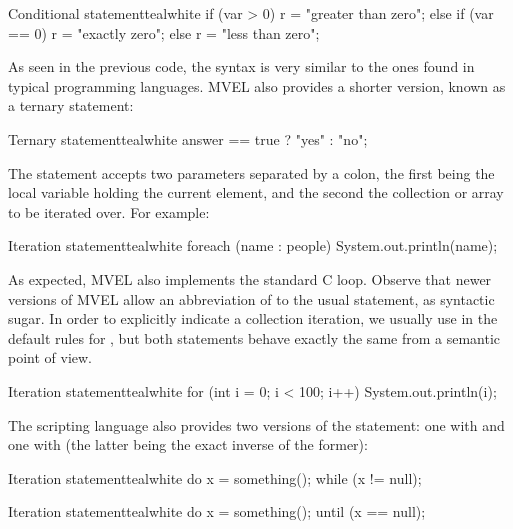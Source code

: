 \begin{codebox}{Conditional statement}{teal}{\icnote}{white}
if (var > 0) {
   r = "greater than zero";
}
else if (var == 0) { 
   r = "exactly zero";
}
else { 
   r = "less than zero";
}
\end{codebox}

As seen in the previous code, the syntax is very similar to the ones found in typical programming languages. \gls{MVEL} also provides a shorter version, known as a ternary statement:

\begin{codebox}{Ternary statement}{teal}{\icnote}{white}
answer == true ? "yes" : "no";
\end{codebox}

The  statement accepts two parameters separated by a colon, the first being the local variable holding the current element, and the second the collection or array to be iterated over. For example:

\begin{codebox}{Iteration statement}{teal}{\icnote}{white}
foreach (name : people) {
    System.out.println(name);
}
\end{codebox}

As expected, \gls{MVEL} also implements the standard C  loop. Observe that newer versions of \gls{MVEL} allow an abbreviation of  to the usual  statement, as syntactic sugar. In order to explicitly indicate a collection iteration, we usually use  in the default rules for \arara, but both statements behave exactly the same from a semantic point of view. 

\begin{codebox}{Iteration statement}{teal}{\icnote}{white}
for (int i = 0; i < 100; i++) { 
   System.out.println(i);
}
\end{codebox}

The scripting language also provides two versions of the  statement: one with  and one with  (the latter being the exact inverse of the former):

\begin{codebox}{Iteration statement}{teal}{\icnote}{white}
do {
    x = something();
} while (x != null);
\end{codebox}

\begin{codebox}{Iteration statement}{teal}{\icnote}{white}
do {
   x = something();
} until (x == null);
\end{codebox}

